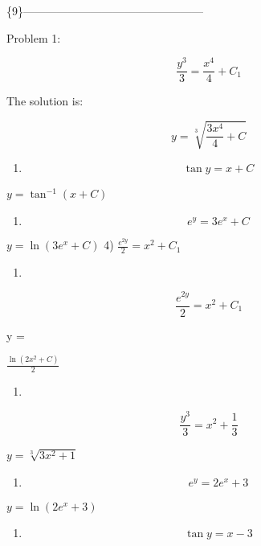 \documentclass[
]{article}
\providecommand{\tightlist}{%
  \setlength{\itemsep}{0pt}\setlength{\parskip}{0pt}}
\begin{document}
\{9\}------------------------------------------------

Problem 1:

\[\frac{y^3}{3} = \frac{x^4}{4} + C_1\]

The solution is:

\[y = \sqrt[3]{\frac{3x^4}{4} + C}\]

\begin{enumerate}
\def\labelenumi{\arabic{enumi})}
\setcounter{enumi}{1}
\tightlist
\item
  \[\tan y = x + C\]
\end{enumerate}

\(y = \tan^{-1} (x + C)\)

\begin{enumerate}
\def\labelenumi{\arabic{enumi})}
\setcounter{enumi}{2}
\tightlist
\item
  \[e^y = 3e^x + C\]
\end{enumerate}

\(y = \ln (3e^x + C)\) 4) \(\frac{e^{2y}}{2} = x^2 + C_1\)

\begin{enumerate}
\def\labelenumi{\arabic{enumi})}
\setcounter{enumi}{3}
\tightlist
\item
\end{enumerate}

\[\frac{e^{2y}}{2} = x^2 + C_1\]

y =

\(\frac{\ln(2x^2 + C)}{2}\)

\begin{enumerate}
\def\labelenumi{\arabic{enumi})}
\setcounter{enumi}{4}
\tightlist
\item
\end{enumerate}

\[\frac{y^3}{3} = x^2 + \frac{1}{3}\]

\(y = \sqrt[3]{3x^2 + 1}\)

\begin{enumerate}
\def\labelenumi{\arabic{enumi})}
\setcounter{enumi}{5}
\tightlist
\item
  \[e^y = 2e^x + 3\]
\end{enumerate}

\(y = \ln (2e^x + 3)\)

\begin{enumerate}
\def\labelenumi{\arabic{enumi})}
\setcounter{enumi}{6}
\tightlist
\item
  \[\tan y = x - 3\]
\end{enumerate}
\end{document}
